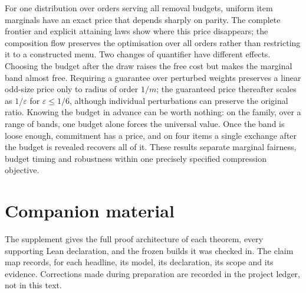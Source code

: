 For one distribution over orders serving all removal budgets, uniform item marginals have
an exact price that depends sharply on parity. The complete frontier and explicit attaining
laws show where this price disappears; the composition flow preserves the optimisation over
all orders rather than restricting it to a constructed menu. Two changes of quantifier have
different effects. Choosing the budget after the draw raises the free cost but makes the
marginal band almost free. Requiring a guarantee over perturbed weights preserves a linear
odd-size price only to radius of order $1/m$; the guaranteed price thereafter scales as
$1/\varepsilon$ for $\varepsilon\le1/6$, although individual perturbations can preserve the original ratio.
Knowing the budget in advance can be worth nothing: on the family, over a range of bands, one
budget alone forces the universal value. Once the band is loose enough, commitment has a price,
and on four items a single exchange after the budget is revealed recovers all of it.
These results separate marginal fairness, budget timing and robustness within one precisely
specified compression objective.

\section*{Companion material}
The supplement gives the full proof architecture of each theorem, every supporting Lean
declaration, and the frozen builds it was checked in. The claim map records, for each
headline, its model, its declaration, its scope and its evidence. Corrections made during
preparation are recorded in the project ledger, not in this text.

